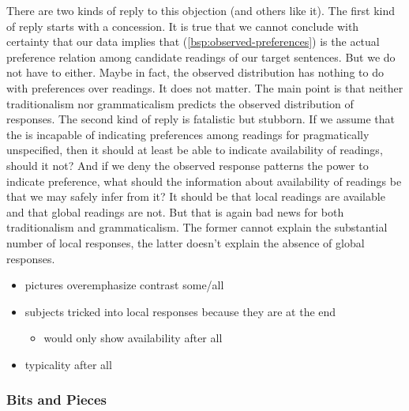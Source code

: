 \documentclass[fleqn,reqno,10pt,draft]{article}
\newcommand{\ivt}{\acro{ivt}}
\begin{document}
There are two kinds of reply to this objection (and others like
it). The first kind of reply starts with a concession. It is true that
we cannot conclude with certainty that our data implies that
(\ref{bsp:observed-preferences}) is the actual preference relation
among candidate readings of our target sentences. But we do not have
to either. Maybe in fact, the observed distribution has nothing to do
with preferences over readings. It does not matter. The main point is
that neither traditionalism nor grammaticalism predicts the observed
distribution of responses. The second kind of reply is fatalistic but
stubborn. If we assume that the \ivt is incapable of indicating
preferences among readings for pragmatically unspecified, then it
should at least be able to indicate availability of readings, should
it not? And if we deny the observed response patterns the power to
indicate preference, what should the information about availability of
readings be that we may safely infer from it? It should be that local
readings are available and that global readings are not. But that is
again bad news for both traditionalism and grammaticalism. The former
cannot explain the substantial number of local responses, the latter
doesn't explain the absence of global responses.



\begin{itemize}
\item pictures overemphasize contrast some/all
\item subjects tricked into local responses because they are at the end
  \begin{itemize}
  \item would only show availability after all
  \end{itemize}
\item typicality after all
\end{itemize}

\subsubsection{Bits and Pieces}
\label{sec:bits-pieces}
\end{document}
